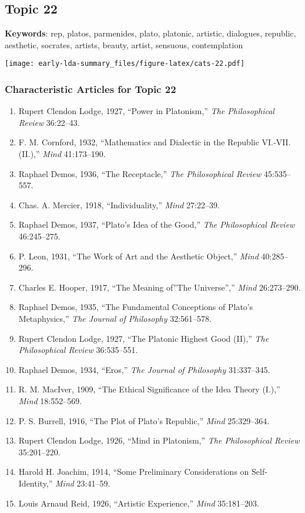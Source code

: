 \documentclass[
]{article}
\begin{document}
\newpage

\hypertarget{topic-22}{%
\subsection{Topic 22}\label{topic-22}}

\textbf{Keywords}: rep, platos, parmenides, plato, platonic, artistic,
dialogues, republic, aesthetic, socrates, artists, beauty, artist,
sensuous, contemplation

\texttt{[image: early-lda-summary\_files/figure-latex/cats-22.pdf]}
\newpage 

\hypertarget{characteristic-articles-for-topic-22}{%
\subsubsection{Characteristic Articles for Topic
22}\label{characteristic-articles-for-topic-22}}

\begin{enumerate}
\def\labelenumi{\arabic{enumi}.}
\item
  Rupert Clendon Lodge, 1927, ``Power in Platonism,'' \emph{The
  Philosophical Review} 36:22--43.
\item
  F. M. Cornford, 1932, ``Mathematics and Dialectic in the Republic
  VI.-VII. (II.),'' \emph{Mind} 41:173--190.
\item
  Raphael Demos, 1936, ``The Receptacle,'' \emph{The Philosophical
  Review} 45:535--557.
\item
  Chas. A. Mercier, 1918, ``Individuality,'' \emph{Mind} 27:22--39.
\item
  Raphael Demos, 1937, ``Plato's Idea of the Good,'' \emph{The
  Philosophical Review} 46:245--275.
\item
  P. Leon, 1931, ``The Work of Art and the Aesthetic Object,''
  \emph{Mind} 40:285--296.
\item
  Charles E. Hooper, 1917, ``The Meaning of''The Universe'',''
  \emph{Mind} 26:273--290.
\item
  Raphael Demos, 1935, ``The Fundamental Conceptions of Plato's
  Metaphysics,'' \emph{The Journal of Philosophy} 32:561--578.
\item
  Rupert Clendon Lodge, 1927, ``The Platonic Highest Good (II),''
  \emph{The Philosophical Review} 36:535--551.
\item
  Raphael Demos, 1934, ``Eros,'' \emph{The Journal of Philosophy}
  31:337--345.
\item
  R. M. MacIver, 1909, ``The Ethical Significance of the Idea Theory
  (I.),'' \emph{Mind} 18:552--569.
\item
  P. S. Burrell, 1916, ``The Plot of Plato's Republic,'' \emph{Mind}
  25:329--364.
\item
  Rupert Clendon Lodge, 1926, ``Mind in Platonism,'' \emph{The
  Philosophical Review} 35:201--220.
\item
  Harold H. Joachim, 1914, ``Some Preliminary Considerations on
  Self-Identity,'' \emph{Mind} 23:41--59.
\item
  Louis Arnaud Reid, 1926, ``Artistic Experience,'' \emph{Mind}
  35:181--203.
\end{enumerate}
\end{document}
